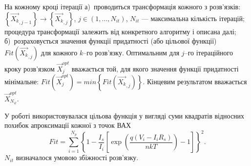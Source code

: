 На кожному кроці ітерації
а)~проводиться трансформація кожного з розв'язків:
$\left\{\overrightarrow{X_{k}}_{,j-1}\right\}\rightarrow\left\{\overrightarrow{X_{k}}_{,j}\right\}$,
$j\in(1,\ldots, N_{it})$,
$N_{it}$ --- максимальна кількість ітерацій;
процедура трансформації залежить від конкретного алгоритму і описана далі;
б)~розраховується значення функції придатності (або цільової функції) $Fit(\overrightarrow{X_k}_{,j})$
для кожного $k$--го розв'язку.
Оптимальним для $j$--го ітераційного кроку розв'язком $\overrightarrow{X}_{j}^{opt}$ вважається той, для якого
значення функції придатності мінімальне:
$Fit(\overrightarrow{X}_{j}^{opt})=min\left\{Fit(\overrightarrow{X_k}_{,j})\right\}$.
Кінцевим результатом вважається $\overrightarrow{X}_{N_{it}}^{opt}$.

У роботі використовувалася цільова функція у вигляді суми квадратів відносних похибок апроксимації кожної з точок ВАХ
\begin{equation}
\label{eqEAFit}
Fit=\sum_{i=1}^{N_p}\left\{1-\frac{I_s}{I_i}\left[\exp\left(\frac{q(V_i-I_iR_s)}{nkT}\right)-1\right]\right\}^2.
\end{equation}
$N_{it}$ визначалося умовою збіжності розв'язку.

